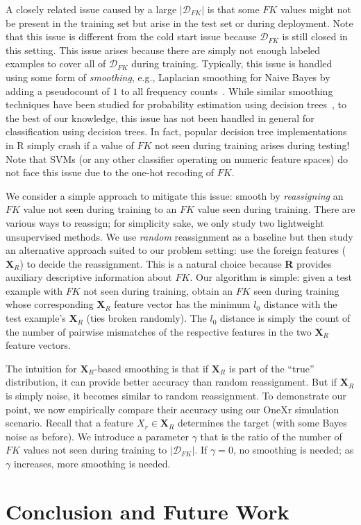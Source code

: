 \documentclass[sigconf]{acmart}
\begin{document}
A closely related issue caused by a large $|\mathcal{D}_{FK}|$ is that some $FK$ values might not be present in the training set but arise 
in the test set or during deployment. Note that this issue is different from the cold start issue because $\mathcal{D}_{FK}$ is still closed 
in this setting. This issue arises because there are simply not enough labeled examples to cover 
all of $\mathcal{D}_{FK}$ during training. Typically, this issue is handled using some form of \textit{smoothing}, e.g., Laplacian smoothing
for Naive Bayes by adding a pseudocount of $1$ to all frequency counts~\cite{mitchellbook}.
While similar smoothing techniques have been studied for probability estimation using decision trees~\cite{pedro2003}, to the best of our knowledge, 
this issue has not been handled in general for classification using decision trees. In fact, popular decision tree implementations in R simply 
crash if a value of $FK$ not seen during training arises during testing! Note that SVMs (or any other classifier operating on numeric 
feature spaces) do not face this issue due to the one-hot recoding of $FK$. 

We consider a simple approach to mitigate this issue: smooth by \textit{reassigning} an $FK$ value not seen during training to an $FK$ value 
seen during training. There are various ways to reassign; for simplicity sake, we only study two lightweight unsupervised methods. 
We use \textit{random} reassignment as a baseline but then study an alternative approach suited to our problem setting: use the foreign features 
($\textbf{X}_R$) to decide the reassignment. This is a natural choice because \textbf{R} provides auxiliary descriptive information about $FK$.
Our algorithm is simple: given a test example with $FK$ not seen during training, obtain an $FK$ seen during training whose corresponding 
$\textbf{X}_R$ feature vector has the minimum $l_0$ distance with the test example's $\textbf{X}_R$ (ties broken randomly). The $l_0$ distance is
simply the count of the number of pairwise mismatches of the respective features in the two $\textbf{X}_R$ feature vectors. 

The intuition for $\textbf{X}_R$-based smoothing is that if $\textbf{X}_R$ is part of the ``true'' distribution, it can provide better accuracy 
than random reassignment. But if $\textbf{X}_R$ is simply noise, it becomes similar to random reassignment.
To demonstrate our point, we now empirically compare their accuracy using our OneXr simulation scenario. Recall that a feature $X_r \in \textbf{X}_R$
determines the target (with some Bayes noise as before). We introduce a parameter $\gamma$ that is the ratio of the number of $FK$ values not seen 
during training to $|\mathcal{D}_{FK}|$. If $\gamma = 0$, no smoothing is needed; as $\gamma$ increases, more smoothing is needed.




\section{Conclusion and Future Work}





\end{document}
